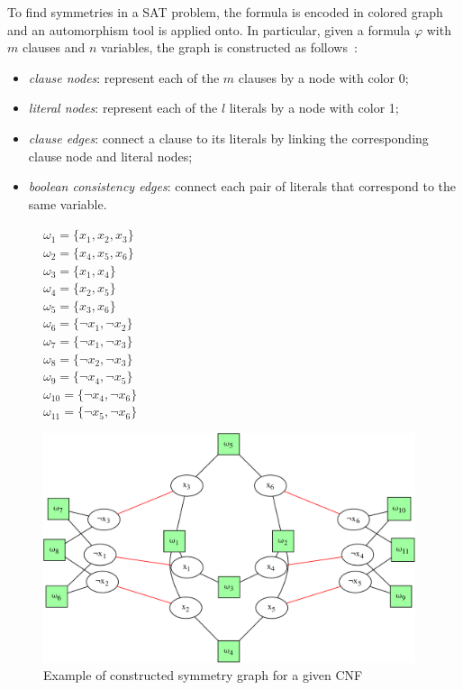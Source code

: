 To find symmetries in a SAT problem, the formula is encoded in colored graph
and an automorphism tool is applied onto. In particular, given a formula $\varphi$ with
$m$ clauses and $n$ variables, the graph is constructed as follows~\cite{biere2009handbook}:
\begin{itemize}
 \item \emph{clause nodes}: represent each of the $m$ clauses by a node with color 0;
 \item \emph{literal nodes}: represent each of the $l$ literals by a node with color 1;
 \item \emph{clause edges}: connect a clause to its literals by linking the corresponding  clause node and literal nodes;
 \item \emph{boolean consistency edges}: connect each pair of literals that correspond to the same variable.
\end{itemize}

\begin{figure}[h!]
 \begin{minipage}[c]{.2\textwidth}
  $\omega_{1} = \{ x_{1}, x_{2}, x_{3} \}$ \\
  $\omega_{2} = \{ x_{4}, x_{5}, x_{6} \}$ \\
  $\omega_{3} = \{ x_{1}, x_{4} \}$ \\
  $\omega_{4} = \{ x_{2}, x_{5} \}$ \\
  $\omega_{5} = \{ x_{3}, x_{6} \}$ \\
  $\omega_{6} = \{ \neg x_{1}, \neg x_{2} \}$ \\
  $\omega_{7} = \{ \neg x_{1}, \neg x_{3} \}$ \\
  $\omega_{8} = \{ \neg x_{2}, \neg x_{3} \}$ \\
  $\omega_{9} = \{ \neg x_{4}, \neg x_{5} \}$ \\
  $\omega_{10} = \{ \neg x_{4}, \neg x_{6} \}$ \\
  $\omega_{11} = \{ \neg x_{5}, \neg x_{6} \}$ \\
  
 \end{minipage}
 \begin{minipage}[l]{.75\textwidth}
  \includegraphics[width=4.3in]{cnfs/graph_cnf_no_opt-crop}
 \end{minipage}
 \caption{Example of constructed symmetry graph for a given CNF}
 \label{fig:graph_no_opt}
\end{figure}

